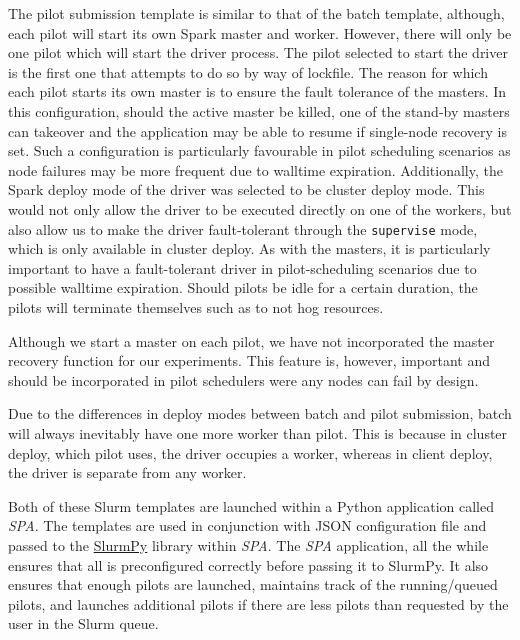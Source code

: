 \documentclass{IEEEtran}
\newcommand{\tristan}[1]{\color{red}\textbf{Note from Tristan}:
      #1 \color{black}}
\newcommand{\TG}[1]{\tristan{#1}}
\begin{document}
    The pilot submission template is similar to that of the batch template, although,
    each pilot will start its own Spark master and worker. However, there will only be one
    pilot which will start the driver process. The pilot selected to start the driver is the first one
    that attempts to do so by way of lockfile.
    The reason for 
    which each pilot starts its own master is to ensure the fault tolerance of the 
    masters. In this configuration, should the active master be killed, one
    of the stand-by masters can takeover and the application may be able to 
    resume if single-node recovery is set. Such a configuration is particularly favourable in pilot scheduling 
    scenarios as node failures may be more frequent due to walltime expiration.
    Additionally, the Spark deploy mode of the driver was selected to be cluster deploy mode.
    This would not only allow the driver to be executed directly on one of the workers,
    but also allow us to make the driver fault-tolerant through the
    \texttt{supervise} mode, which is only available in cluster deploy. As
    with the masters, it is particularly important to have a fault-tolerant
    driver in pilot-scheduling scenarios due to possible walltime
    expiration.
    Should pilots be idle for a certain duration, the
    pilots will terminate themselves such as to not hog resources.

    Although we start a master on each pilot, we have not incorporated the master recovery function
    for our experiments. This feature is, however, important and should be incorporated in pilot schedulers
    were any nodes can fail by design.

    Due to the differences in deploy modes between batch and pilot submission, 
    batch will always inevitably have one more worker than pilot. This is because
    in cluster deploy, which pilot uses, the driver occupies a worker, whereas in
    client deploy, the driver is separate from any worker.

    Both of these Slurm templates are launched within a Python application called
    \textit{SPA}. The templates are used in conjunction with JSON configuration 
    file and passed to the \href{https://github.com/brentp/slurmpy}{SlurmPy} library within \textit{SPA}.
    The \textit{SPA} application, all the while ensures that all is preconfigured
    correctly before passing it to SlurmPy. It also ensures that enough pilots are
    launched, maintains track of the running/queued pilots, and launches additional
    pilots if there are less pilots than requested by the user in the Slurm queue.
\end{document}
